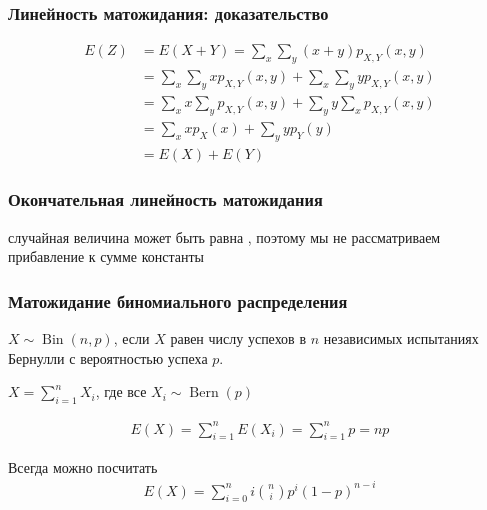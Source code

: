 \documentclass[hyperref=unicode,graphics=pdflatex,13pt,xcolor={usenames,dvipsnames}]{beamer}
\renewcommand\emph[1]{{\color{blue}{#1}}}
\DeclareMathOperator{\Bin}{Bin}
\DeclareMathOperator{\Bern}{Bern}
\begin{document}
\begin{frame}
  \frametitle{Линейность матожидания: доказательство}

  \begin{align*}
    E(Z) &= E(X + Y) = \sum_x \sum_y (x + y) p_{X, Y}(x, y) \\
         &= \sum_x \sum_y x  p_{X, Y}(x, y) + \sum_x \sum_y  y p_{X, Y}(x, y) \\
         &= \sum_x x \sum_y p_{X, Y}(x, y) + \sum_y y \sum_x p_{X, Y}(x, y) \\
         &= \sum_x x p_X(x) + \sum_y y p_Y(y) \\
         &= E(X) + E(Y)
  \end{align*}
\end{frame}

\begin{frame}
  \frametitle{Окончательная линейность матожидания}

  \begin{center}
  \end{center}

  \emph{NB:} случайная величина может быть равна \emph{константе}, поэтому мы не рассматриваем прибавление к сумме константы
\end{frame}

\begin{frame}
  \frametitle{Матожидание биномиального распределения}
  \emph{Напоминание:} $X \sim \Bin(n, p)$, если $X$ равен числу успехов в $n$ независимых испытаниях Бернулли с вероятностью успеха $p$.

  \pause \vspace{1cm}

  $X = \sum_{i = 1}^n X_i$, где все $X_i \sim \Bern(p)$

  \pause

  \begin{align*}
    E(X) = \sum_{i = 1}^n E(X_i) = \sum_{i = 1}^n p = np
  \end{align*}

  \pause

  Всегда можно посчитать \emph{в лоб}
  \begin{align*}
    E(X) = \sum_{i = 0}^n i \binom{n}{i}p^i(1 - p)^{n - i}
  \end{align*}
\end{frame}
\end{document}
